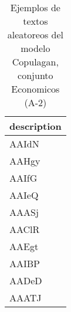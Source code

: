 \begin{table}[H]
\centering
\fontsize{8}{14}\selectfont
\caption{Ejemplos de textos aleatoreos del modelo Copulagan, conjunto Economicos (A-2)}
\label{table-sample10-economicos-a-2-copulagan-text}
\begin{tabular}{|m{50em}|}
\hline
\rowcolor[gray]{0.8}
description \\
\hline AAIdN \\
\hline AAHgy \\
\hline AAIfG \\
\hline AAIeQ \\
\hline AAASj \\
\hline AAClR \\
\hline AAEgt \\
\hline AAIBP \\
\hline AADeD \\
\hline AAATJ \\
\hline
\end{tabular}
\end{table}
